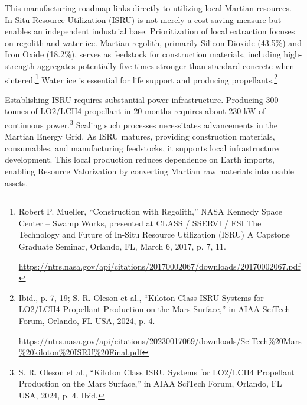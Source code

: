 \documentclass[fontsize=10pt, oneside, DIV=calc]{scrartcl}
\begin{document}
\medskip

\noindent
This manufacturing roadmap links directly to utilizing local Martian resources. In-Situ Resource Utilization (ISRU) is not merely a cost-saving measure but enables an independent industrial base. Prioritization of local extraction focuses on regolith and water ice. Martian regolith, primarily Silicon Dioxide (43.5\%) and Iron Oxide (18.2\%), serves as feedstock for construction materials, including high-strength aggregates potentially five times stronger than standard concrete when sintered.\footnote{Robert P. Mueller, ``Construction with Regolith,'' NASA Kennedy Space Center – Swamp Works, presented at CLASS / SSERVI / FSI The Technology and Future of In-Situ Resource Utilization (ISRU) A Capstone Graduate Seminar, Orlando, FL, March 6, 2017, p. 7, 11. 







\href{https://ntrs.nasa.gov/api/citations/20170002067/downloads/20170002067.pdf}{\url{https://ntrs.nasa.gov/api/citations/20170002067/downloads/20170002067.pdf}}} Water ice is essential for life support and producing propellants.\footnote{Ibid., p. 7, 19; S. R. Oleson et al., ``Kiloton Class ISRU Systems for LO2/LCH4 Propellant Production on the Mars Surface,'' in AIAA SciTech Forum, Orlando, FL USA, 2024, p. 4. 







\href{https://ntrs.nasa.gov/api/citations/20230017069/downloads/SciTech\%20Mars\%20kiloton\%20ISRU\%20Final.pdf}{\url{https://ntrs.nasa.gov/api/citations/20230017069/downloads/SciTech\%20Mars\%20kiloton\%20ISRU\%20Final.pdf}}}

\medskip

\noindent
Establishing ISRU requires substantial power infrastructure. Producing 300 tonnes of LO2/LCH4 propellant in 20 months requires about 230 kW of continuous power.\footnote{S. R. Oleson et al., ``Kiloton Class ISRU Systems for LO2/LCH4 Propellant Production on the Mars Surface,'' in AIAA SciTech Forum, Orlando, FL USA, 2024, p. 4. Ibid.} Scaling such processes necessitates advancements in the Martian Energy Grid. As ISRU matures, providing construction materials, consumables, and manufacturing feedstocks, it supports local infrastructure development. This local production reduces dependence on Earth imports, enabling Resource Valorization by converting Martian raw materials into usable assets.
\end{document}
